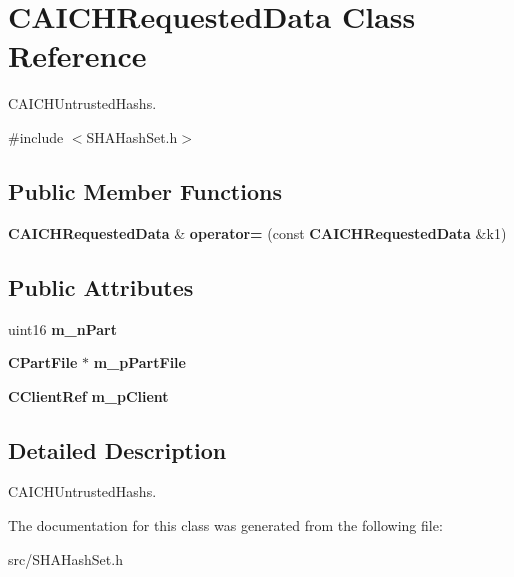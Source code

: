 \section{CAICHRequestedData Class Reference}
\label{classCAICHRequestedData}


CAICHUntrustedHashs.  


{\ttfamily \#include $<$SHAHashSet.h$>$}\subsection*{Public Member Functions}
\begin{DoxyCompactItemize}
\item 
{\bf CAICHRequestedData} \& {\bfseries operator=} (const {\bf CAICHRequestedData} \&k1)\label{classCAICHRequestedData_ae10bb5c03c3ddab3e504c44a29457b99}

\end{DoxyCompactItemize}
\subsection*{Public Attributes}
\begin{DoxyCompactItemize}
\item 
uint16 {\bfseries m\_\-nPart}\label{classCAICHRequestedData_a8ceb45f8546388a40762d4ad05061618}

\item 
{\bf CPartFile} $\ast$ {\bfseries m\_\-pPartFile}\label{classCAICHRequestedData_afbc3adf05b691e12429e8b95a19206dc}

\item 
{\bf CClientRef} {\bfseries m\_\-pClient}\label{classCAICHRequestedData_a196315513b2ab58cf77b61bff29a13d1}

\end{DoxyCompactItemize}


\subsection{Detailed Description}
CAICHUntrustedHashs. 

The documentation for this class was generated from the following file:\begin{DoxyCompactItemize}
\item 
src/SHAHashSet.h\end{DoxyCompactItemize}

